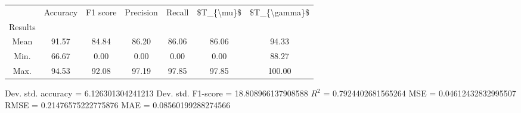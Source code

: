 \begin{tabular}{|c|c|c|c|c|c|c|}
\toprule
{} &  Accuracy &  F1 score &  Precision &  Recall &  \$T\_\{\textbackslash mu\}\$ &  \$T\_\{\textbackslash gamma\}\$ \\
Results &           &           &            &         &            &               \\
\hline
Mean    &     91.57 &     84.84 &      86.20 &   86.06 &      86.06 &         94.33 \\
Min.    &     66.67 &      0.00 &       0.00 &    0.00 &       0.00 &         88.27 \\
Max.    &     94.53 &     92.08 &      97.19 &   97.85 &      97.85 &        100.00 \\
\bottomrule
\end{tabular}

 Dev. std. accuracy = 6.126301304241213
 Dev. std. F1-score = 18.808966137908588
 $R^2$ = 0.7924402681565264
 MSE = 0.04612432832995507
 RMSE = 0.21476575222775876
 MAE = 0.08560199288274566